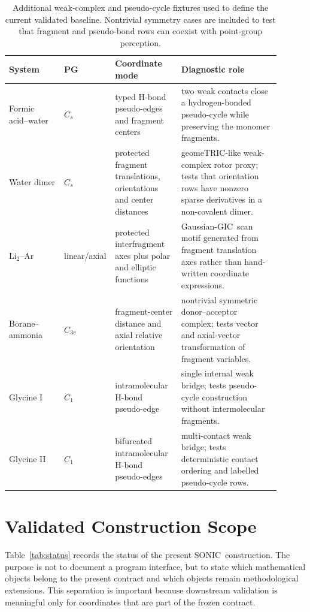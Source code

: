 \documentclass[journal=jctcce,manuscript=article,layout=traditional]{achemso}
\newcommand{\SONIC}{SONIC}
\newcommand{\GIC}{GIC}
\theoremstyle{definition}
\begin{document}
\begin{table}[htbp]
\centering
\scriptsize
\setlength{\tabcolsep}{3pt}
\renewcommand{\arraystretch}{0.95}
\caption{Additional weak-complex and pseudo-cycle fixtures used to define the
current validated baseline.  Nontrivial symmetry cases are included to test
that fragment and pseudo-bond rows can coexist with point-group perception.}
\label{tab:pseudo-cycle-fixtures}
\begin{tabular}{@{}p{0.20\linewidth}p{0.10\linewidth}p{0.24\linewidth}p{0.36\linewidth}@{}}
\toprule
System & PG & Coordinate mode & Diagnostic role \\
\midrule
Formic acid--water & \(C_s\) & typed H-bond pseudo-edges and fragment centers &
two weak contacts close a hydrogen-bonded pseudo-cycle while preserving the
monomer fragments. \\
\midrule
Water dimer & \(C_s\) & protected fragment translations, orientations and
center distances & geomeTRIC-like weak-complex rotor proxy; tests that
orientation rows have nonzero sparse derivatives in a non-covalent dimer. \\
\midrule
Li\(_2\)--Ar & linear/axial & protected interfragment axes plus polar and
elliptic functions & Gaussian-\GIC\ scan motif generated from fragment
translation axes rather than hand-written coordinate expressions. \\
\midrule
Borane--ammonia & \(C_{3v}\) & fragment-center distance and axial relative
orientation & nontrivial symmetric donor--acceptor complex; tests vector and
axial-vector transformation of fragment variables. \\
\midrule
Glycine I & \(C_1\) & intramolecular H-bond pseudo-edge & single internal
weak bridge; tests pseudo-cycle construction without intermolecular fragments. \\
\midrule
Glycine II & \(C_1\) & bifurcated intramolecular H-bond pseudo-edges &
multi-contact weak bridge; tests deterministic contact ordering and labelled
pseudo-cycle rows. \\
\bottomrule
\end{tabular}
\end{table}

\section{Validated Construction Scope}

Table~\ref{tab:status} records the status of the present \SONIC\
construction.  The purpose is not to document a program interface, but to state
which mathematical objects belong to the present contract and which
objects remain methodological extensions.  This separation is important because
downstream validation is meaningful only for coordinates that are part of the
frozen contract.
\end{document}
